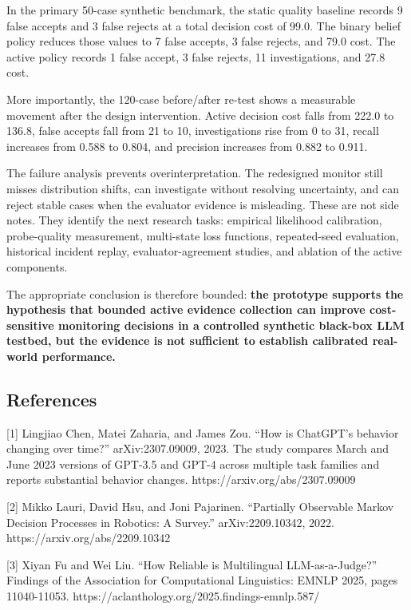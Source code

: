 \documentclass[
]{article}
\begin{document}
In the primary 50-case synthetic benchmark, the static quality baseline
records 9 false accepts and 3 false rejects at a total decision cost of
99.0. The binary belief policy reduces those values to 7 false accepts,
3 false rejects, and 79.0 cost. The active policy records 1 false
accept, 3 false rejects, 11 investigations, and 27.8 cost.

More importantly, the 120-case before/after re-test shows a measurable
movement after the design intervention. Active decision cost falls from
222.0 to 136.8, false accepts fall from 21 to 10, investigations rise
from 0 to 31, recall increases from 0.588 to 0.804, and precision
increases from 0.882 to 0.911.

The failure analysis prevents overinterpretation. The redesigned monitor
still misses distribution shifts, can investigate without resolving
uncertainty, and can reject stable cases when the evaluator evidence is
misleading. These are not side notes. They identify the next research
tasks: empirical likelihood calibration, probe-quality measurement,
multi-state loss functions, repeated-seed evaluation, historical
incident replay, evaluator-agreement studies, and ablation of the active
components.

The appropriate conclusion is therefore bounded: \textbf{the prototype
supports the hypothesis that bounded active evidence collection can
improve cost-sensitive monitoring decisions in a controlled synthetic
black-box LLM testbed, but the evidence is not sufficient to establish
calibrated real-world performance.}

\subsection{References}\label{references}

{[}1{]} Lingjiao Chen, Matei Zaharia, and James Zou. ``How is ChatGPT's
behavior changing over time?'' arXiv:2307.09009, 2023. The study
compares March and June 2023 versions of GPT-3.5 and GPT-4 across
multiple task families and reports substantial behavior changes.
https://arxiv.org/abs/2307.09009

{[}2{]} Mikko Lauri, David Hsu, and Joni Pajarinen. ``Partially
Observable Markov Decision Processes in Robotics: A Survey.''
arXiv:2209.10342, 2022. https://arxiv.org/abs/2209.10342

{[}3{]} Xiyan Fu and Wei Liu. ``How Reliable is Multilingual
LLM-as-a-Judge?'' Findings of the Association for Computational
Linguistics: EMNLP 2025, pages 11040-11053.
https://aclanthology.org/2025.findings-emnlp.587/
\end{document}
